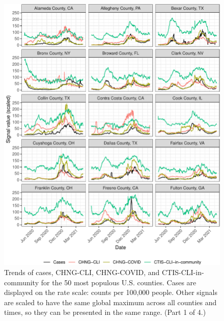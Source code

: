 \documentclass[9pt,twoside,lineno]{pnas-new}
\begin{document}
\begin{figure}

{\centering \includegraphics[width=\textwidth]{fig/county-trend-grids-1-1} 

}

\caption{Trends of cases, CHNG-CLI, CHNG-COVID, and CTIS-CLI-in-community for the 50 most populous U.S. counties. Cases are displayed on the rate scale: counts per 100,000 people. Other signals are scaled to have the same global maximum across all counties and times, so they can be presented in the same range. (Part 1 of 4.)}\label{fig:county-trend-grids-1}
\end{figure}

\clearpage
\end{document}

